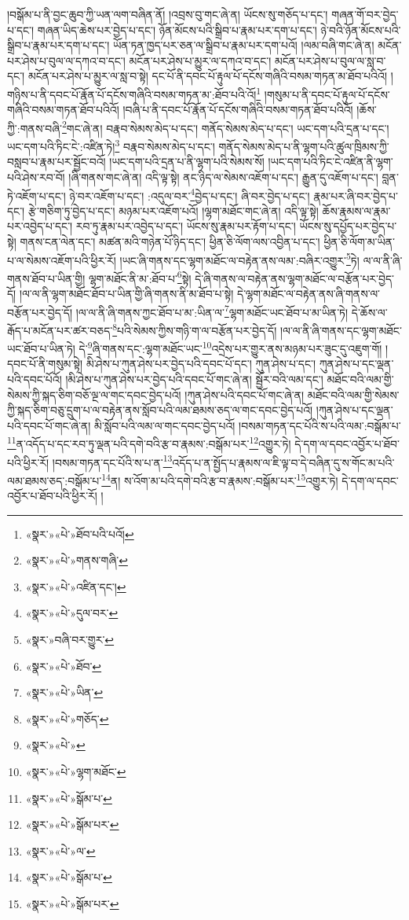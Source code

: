 །བསྒོམ་པ་ནི་བྱང་ཆུབ་ཀྱི་ཡན་ལག་བཞིན་ནོ། །འབྲས་བུ་གང་ཞེ་ན། ཡོངས་སུ་གཅོད་པ་དང་། གཞན་གོ་བར་བྱེད་པ་དང་། གཞན་ཡིད་ཆེས་པར་བྱེད་པ་དང་། ཉོན་མོངས་པའི་སྒྲིབ་པ་རྣམ་པར་དག་པ་དང་། ཉེ་བའི་ཉོན་མོངས་པའི་སྒྲིབ་པ་རྣམ་པར་དག་པ་དང་། ཡོན་ཏན་ཁྱད་པར་ཅན་ལ་སྒྲིབ་པ་རྣམ་པར་དག་པའོ། །ལམ་བཞི་གང་ཞེ་ན། མངོན་པར་ཤེས་པ་བུལ་ལ་དཀའ་བ་དང་། མངོན་པར་ཤེས་པ་མྱུར་ལ་དཀའ་བ་དང་། མངོན་པར་ཤེས་པ་བུལ་ལ་སླ་བ་དང་། མངོན་པར་ཤེས་པ་མྱུར་ལ་སླ་བ་སྟེ། དང་པོ་ནི་དབང་པོ་རྟུལ་པོ་དངོས་གཞིའི་བསམ་གཏན་མ་ཐོབ་པའིའོ། །གཉིས་པ་ནི་དབང་པོ་རྣོན་པོ་དངོས་གཞིའི་བསམ་གཏན་མ་:ཐོབ་པའི་འོ།\footnote{«སྣར་»«པེ་»ཐོབ་པའི་པའོ།} །གསུམ་པ་ནི་དབང་པོ་རྟུལ་པོ་དངོས་གཞིའི་བསམ་གཏན་ཐོབ་པའིའོ། །བཞི་པ་ནི་དབང་པོ་རྣོན་པོ་དངོས་གཞིའི་བསམ་གཏན་ཐོབ་པའིའོ། །ཆོས་ཀྱི་:གནས་བཞི་\footnote{«སྣར་»«པེ་»གནས་གཞི་}གང་ཞེ་ན། བརྣབ་སེམས་མེད་པ་དང་། གནོད་སེམས་མེད་པ་དང་། ཡང་དག་པའི་དྲན་པ་དང་། ཡང་དག་པའི་ཏིང་ངེ་:འཛིན་ཏེ།\footnote{«སྣར་»«པེ་»འཛིན་དང་།} བརྣབ་སེམས་མེད་པ་དང་། གནོད་སེམས་མེད་པ་ནི་ལྷག་པའི་ཚུལ་ཁྲིམས་ཀྱི་བསླབ་པ་རྣམ་པར་སྦྱོང་བའོ། །ཡང་དག་པའི་དྲན་པ་ནི་ལྷག་པའི་སེམས་སོ། །ཡང་དག་པའི་ཏིང་ངེ་འཛིན་ནི་ལྷག་པའི་ཤེས་རབ་བོ། །ཞི་གནས་གང་ཞེ་ན། འདི་ལྟ་སྟེ། ནང་ཉིད་ལ་སེམས་འཇོག་པ་དང་། རྒྱུན་དུ་འཇོག་པ་དང་། བླན་ཏེ་འཇོག་པ་དང་། ཉེ་བར་འཇོག་པ་དང་། :འདུལ་བར་\footnote{«སྣར་»«པེ་»དུལ་བར་}བྱེད་པ་དང་། ཞི་བར་བྱེད་པ་དང་། རྣམ་པར་ཞི་བར་བྱེད་པ་དང་། རྩེ་གཅིག་ཏུ་བྱེད་པ་དང་། མཉམ་པར་འཇོག་པའོ། །ལྷག་མཐོང་གང་ཞེ་ན། འདི་ལྟ་སྟེ། ཆོས་རྣམས་ལ་རྣམ་པར་འབྱེད་པ་དང་། རབ་ཏུ་རྣམ་པར་འབྱེད་པ་དང་། ཡོངས་སུ་རྣམ་པར་རྟོག་པ་དང་། ཡོངས་སུ་དཔྱོད་པར་བྱེད་པ་སྟེ། གནས་ངན་ལེན་དང་། མཚན་མའི་གཉེན་པོ་ཉིད་དང་། ཕྱིན་ཅི་ལོག་ལས་འབྱིན་པ་དང་། ཕྱིན་ཅི་ལོག་མ་ཡིན་པ་ལ་སེམས་འཇོག་པའི་ཕྱིར་རོ། །ཡང་ཞི་གནས་དང་ལྷག་མཐོང་ལ་བརྟེན་ནས་ལམ་:བཞིར་འགྱུར་\footnote{«སྣར་»བཞི་བར་གྱུར་}ཏེ། ལ་ལ་ནི་ཞི་གནས་ཐོབ་པ་ཡིན་གྱི། ལྷག་མཐོང་ནི་མ་:ཐོབ་པ་\footnote{«སྣར་»«པེ་»ཐོབ་}སྟེ། དེ་ཞི་གནས་ལ་བརྟེན་ནས་ལྷག་མཐོང་ལ་བརྩོན་པར་བྱེད་དོ། །ལ་ལ་ནི་ལྷག་མཐོང་ཐོབ་པ་ཡིན་གྱི་ཞི་གནས་ནི་མ་ཐོབ་པ་སྟེ། དེ་ལྷག་མཐོང་ལ་བརྟེན་ནས་ཞི་གནས་ལ་བརྩོན་པར་བྱེད་དོ། །ལ་ལ་ནི་ཞི་གནས་ཀྱང་ཐོབ་པ་མ་:ཡིན་ལ་\footnote{«སྣར་»«པེ་»ཡིན་}ལྷག་མཐོང་ཡང་ཐོབ་པ་མ་ཡིན་ཏེ། དེ་ཆོས་ལ་རྒོད་པ་མངོན་པར་ཚར་བཅད་\footnote{«སྣར་»«པེ་»གཅོད་}པའི་སེམས་ཀྱིས་གཉི་ག་ལ་བརྩོན་པར་བྱེད་དོ། །ལ་ལ་ནི་ཞི་གནས་དང་ལྷག་མཐོང་ཡང་ཐོབ་པ་ཡིན་ཏེ། དེ་\footnote{«སྣར་»«པེ་»}ཞི་གནས་དང་:ལྷག་མཐོང་ཡང་\footnote{«སྣར་»«པེ་»ལྷག་མཐོང་}འདྲེས་པར་གྱུར་ནས་མཉམ་པར་ཟུང་དུ་འཇུག་གོ། །དབང་པོ་ནི་གསུམ་སྟེ། མི་ཤེས་པ་ཀུན་ཤེས་པར་བྱེད་པའི་དབང་པོ་དང་། ཀུན་ཤེས་པ་དང་། ཀུན་ཤེས་པ་དང་ལྡན་པའི་དབང་པོའོ། །མི་ཤེས་པ་ཀུན་ཤེས་པར་བྱེད་པའི་དབང་པོ་གང་ཞེ་ན། སྦྱོར་བའི་ལམ་དང་། མཐོང་བའི་ལམ་གྱི་སེམས་ཀྱི་སྐད་ཅིག་བཅོ་ལྔ་ལ་གང་དབང་བྱེད་པའོ། །ཀུན་ཤེས་པའི་དབང་པོ་གང་ཞེ་ན། མཐོང་བའི་ལམ་གྱི་སེམས་ཀྱི་སྐད་ཅིག་བཅུ་དྲུག་པ་ལ་བརྟེན་ནས་སློབ་པའི་ལམ་ཐམས་ཅད་ལ་གང་དབང་བྱེད་པའོ། །ཀུན་ཤེས་པ་དང་ལྡན་པའི་དབང་པོ་གང་ཞེ་ན། མི་སློབ་པའི་ལམ་ལ་གང་དབང་བྱེད་པའོ། །བསམ་གཏན་དང་པོའི་ས་པའི་ལམ་:བསྒོམ་པ་\footnote{«སྣར་»«པེ་»སྒོམ་པ་}ན་འདོད་པ་དང་རབ་ཏུ་ལྡན་པའི་དགེ་བའི་རྩ་བ་རྣམས་:བསྒོམ་པར་\footnote{«སྣར་»«པེ་»སྒོམ་པར་}འགྱུར་ཏེ། དེ་དག་ལ་དབང་འབྱོར་པ་ཐོབ་པའི་ཕྱིར་རོ། །བསམ་གཏན་དང་པོའི་ས་པ་ན་\footnote{«སྣར་»«པེ་»ལ་}འདོད་པ་ན་སྤྱོད་པ་རྣམས་ལ་ཇི་ལྟ་བ་དེ་བཞིན་དུ་ས་གོང་མ་པའི་ལམ་ཐམས་ཅད་:བསྒོམ་པ་\footnote{«སྣར་»«པེ་»སྒོམ་པ་}ན། ས་འོག་མ་པའི་དགེ་བའི་རྩ་བ་རྣམས་:བསྒོམ་པར་\footnote{«སྣར་»«པེ་»སྒོམ་པར་}འགྱུར་ཏེ། དེ་དག་ལ་དབང་འབྱོར་པ་ཐོབ་པའི་ཕྱིར་རོ། །
